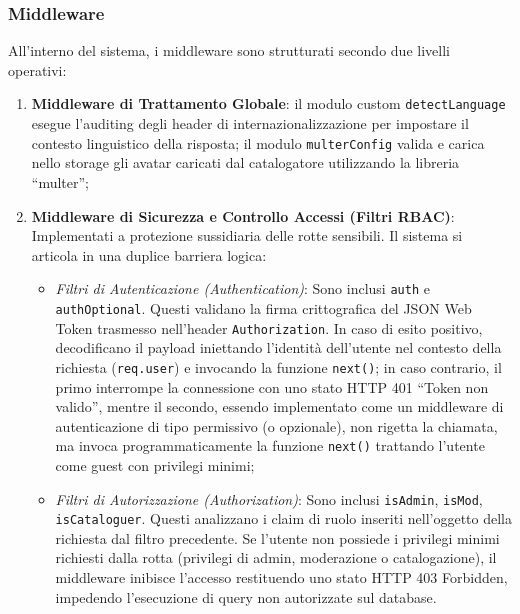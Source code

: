 \documentclass[11pt,a4paper]{article}
\begin{document}
\subsubsection{Middleware}
All'interno del sistema, i middleware sono strutturati secondo due livelli operativi:
\begin{enumerate}
    \item \textbf{Middleware di Trattamento Globale}: il modulo custom \texttt{detectLanguage} esegue l'auditing degli header di internazionalizzazione per impostare il contesto linguistico della risposta; il modulo \texttt{multerConfig} valida e carica nello storage gli avatar caricati dal catalogatore utilizzando la libreria ``multer''; 
    \item \textbf{Middleware di Sicurezza e Controllo Accessi (Filtri RBAC)}: Implementati a protezione sussidiaria delle rotte sensibili. Il sistema si articola in una duplice barriera logica:
    \begin{itemize}
        \item \textit{Filtri di Autenticazione (Authentication)}: Sono inclusi \texttt{auth} e \texttt{authOptional}. Questi validano la firma crittografica del JSON Web Token trasmesso nell'header \texttt{Authorization}. In caso di esito positivo, decodificano il payload iniettando l'identità dell'utente nel contesto della richiesta (\texttt{req.user}) e invocando la funzione \texttt{next()}; in caso contrario, il primo interrompe la connessione con uno stato HTTP 401 ``Token non valido'', mentre il secondo, essendo implementato come un middleware di autenticazione di tipo permissivo (o opzionale), non rigetta la chiamata, ma invoca programmaticamente la funzione \texttt{next()} trattando l’utente come guest con privilegi minimi;
        \item \textit{Filtri di Autorizzazione (Authorization)}: Sono inclusi \texttt{isAdmin}, \texttt{isMod}, \texttt{isCataloguer}. Questi analizzano i claim di ruolo inseriti nell'oggetto della richiesta dal filtro precedente. Se l'utente non possiede i privilegi minimi richiesti dalla rotta (privilegi di admin, moderazione o catalogazione), il middleware inibisce l'accesso restituendo uno stato HTTP 403 Forbidden, impedendo l'esecuzione di query non autorizzate sul database.
    \end{itemize}
\end{enumerate}
\end{document}
